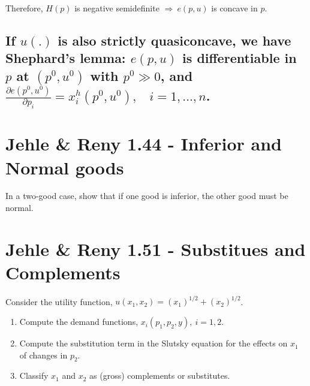 \documentclass{article}
\begin{document}
Therefore, $H(p)$ is negative semidefinite $\Rightarrow \ e(p,u)$ is concave in $p$.


\subsection{If $u(.)$ is also strictly quasiconcave, we have Shephard’s lemma: $e(p, u)$ is differentiable in $p$ at $(p^0, u^0)$ with $p^0 \gg 0$, and $\frac{\partial e(p^0, u^0)}{\partial p_i} = x^h_i (p^0, u^0), \ \ \ \ i = 1, . . . , n$.}















\section{Jehle \& Reny 1.44 - Inferior and Normal goods}
In a two-good case, show that if one good is inferior, the other good must be normal.




\section{Jehle \& Reny 1.51 - Substitues and Complements}
Consider the utility function, $u(x_1, x_2) = (x_1)^{1/2} + (x_2)^{1/2}$.

\begin{enumerate}[label=\alph*.]

\item Compute the demand functions, $x_i(p_1, p_2, y), \ i = 1, 2$.

\item Compute the substitution term in the Slutsky equation for the effects on $x_1$ of changes in $p_2$.

\item Classify $x_1$ and $x_2$ as (gross) complements or substitutes.

\end{enumerate}
\end{document}
